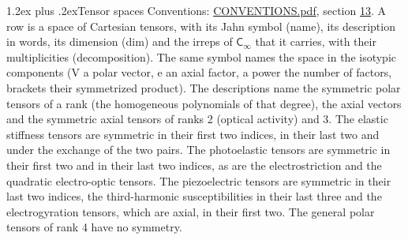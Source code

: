 \documentclass[10pt,a4paper]{article}
\makeatletter
\renewcommand\section{\@startsection{section}{1}{\z@}{-3ex plus -1ex minus -.2ex}%
  {1.2ex plus .2ex}{\normalfont\large\sffamily\bfseries\color{parttitle}}}
\numberwithin{equation}{section}
\newcommand{\grp}[1]{\mathsf{#1}}
\makeatother
\begin{document}
\section{Tensor spaces}\label{s:tensor_spaces}
Conventions: \href{../../CONVENTIONS.pdf}{CONVENTIONS.pdf}, section \href{../../CONVENTIONS.pdf\#conv.13}{13}.
\leavevmode\label{n:head.name}\label{n:head.description}\label{n:head.dim}\label{n:head.decomposition}A row is a space of Cartesian tensors, with its Jahn symbol (name), its description in words, its dimension (dim) and the irreps of $\grp{C_{\infty}}$ that it carries, with their multiplicities (decomposition). \label{n:label.jahn}The same symbol names the space in the isotypic components (V a polar vector, e an axial factor, a power the number of factors, brackets their symmetrized product). The descriptions name the symmetric polar tensors of a rank (the homogeneous polynomials of that degree), the axial vectors and the symmetric axial tensors of ranks 2 (optical activity) and 3. The elastic stiffness tensors are symmetric in their first two indices, in their last two and under the exchange of the two pairs. The photoelastic tensors are symmetric in their first two and in their last two indices, as are the electrostriction and the quadratic electro-optic tensors. The piezoelectric tensors are symmetric in their last two indices, the third-harmonic susceptibilities in their last three and the electrogyration tensors, which are axial, in their first two. The general polar tensors of rank 4 have no symmetry.
\end{document}
